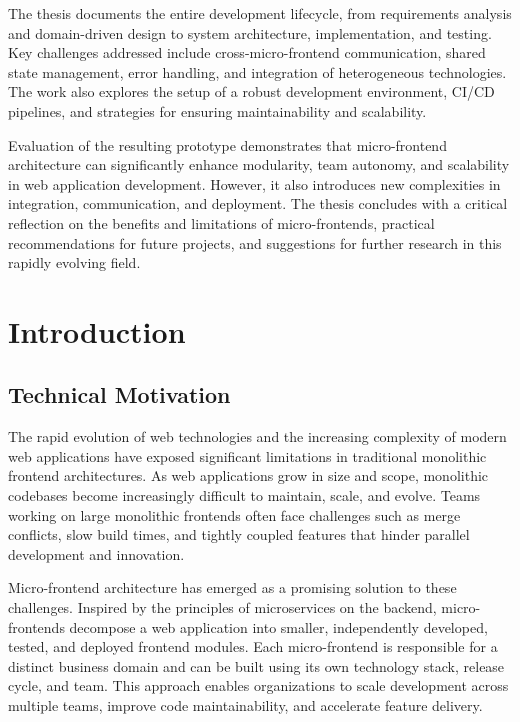 \documentclass[12pt,a4paper]{report}
\begin{document}
The thesis documents the entire development lifecycle, from requirements analysis and domain-driven design to system architecture, implementation, and testing. Key challenges addressed include cross-micro-frontend communication, shared state management, error handling, and integration of heterogeneous technologies. The work also explores the setup of a robust development environment, CI/CD pipelines, and strategies for ensuring maintainability and scalability.

Evaluation of the resulting prototype demonstrates that micro-frontend architecture can significantly enhance modularity, team autonomy, and scalability in web application development. However, it also introduces new complexities in integration, communication, and deployment. The thesis concludes with a critical reflection on the benefits and limitations of micro-frontends, practical recommendations for future projects, and suggestions for further research in this rapidly evolving field.

\tableofcontents
\listoffigures
\listoftables

\chapter{Introduction}
\section{Technical Motivation}
The rapid evolution of web technologies and the increasing complexity of modern web applications have exposed significant limitations in traditional monolithic frontend architectures. As web applications grow in size and scope, monolithic codebases become increasingly difficult to maintain, scale, and evolve. Teams working on large monolithic frontends often face challenges such as merge conflicts, slow build times, and tightly coupled features that hinder parallel development and innovation.

Micro-frontend architecture has emerged as a promising solution to these challenges. Inspired by the principles of microservices on the backend, micro-frontends decompose a web application into smaller, independently developed, tested, and deployed frontend modules. Each micro-frontend is responsible for a distinct business domain and can be built using its own technology stack, release cycle, and team. This approach enables organizations to scale development across multiple teams, improve code maintainability, and accelerate feature delivery.
\end{document}
